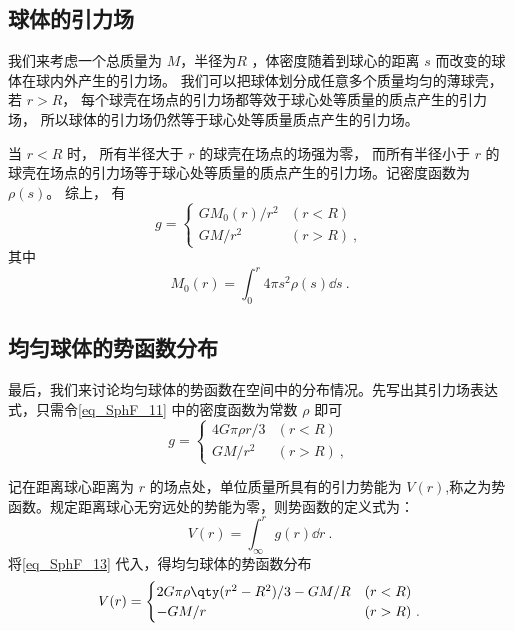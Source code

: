 \subsection{球体的引力场}
我们来考虑一个总质量为 $M$，半径为$R$ ，体密度随着到球心的距离 $s$ 而改变的球体在球内外产生的引力场。 我们可以把球体划分成任意多个质量均匀的薄球壳， 若 $r > R$， 每个球壳在场点的引力场都等效于球心处等质量的质点产生的引力场， 所以球体的引力场仍然等于球心处等质量质点产生的引力场。

当 $r < R$ 时， 所有半径大于 $r$ 的球壳在场点的场强为零， 而所有半径小于 $r$ 的球壳在场点的引力场等于球心处等质量的质点产生的引力场。记密度函数为 $\rho(s)$。 综上， 有
\begin{equation}\label{eq_SphF_11}
g =
\begin{cases}
GM_0(r)/r^2 &(r < R)\\
GM/r^2 & (r > R)~,
\end{cases}
\end{equation}
其中
\begin{equation}
M_0(r) = \int_0^r 4\pi s^2 \rho(s) \dd{s}~.
\end{equation}

\subsection{均匀球体的势函数分布}
最后，我们来讨论均匀球体的势函数在空间中的分布情况。先写出其引力场表达式，只需令\autoref{eq_SphF_11}  中的密度函数为常数 $\rho$ 即可
\begin{equation}\label{eq_SphF_13}
g =
\begin{cases}
4G\pi \rho r/3  &(r < R)\\
GM/r^2 & (r > R)~,
\end{cases}
\end{equation}

记在距离球心距离为 $r$ 的场点处，单位质量所具有的引力势能为 $V(r)$,称之为势函数。规定距离球心无穷远处的势能为零，则势函数的定义式为：
\begin{equation}
V(r) = \int_\infty^r g(r) \dd{r}~.
\end{equation}
将\autoref{eq_SphF_13} 代入，得均匀球体的势函数分布
\begin{equation}
V(r) =
\begin{cases}
2G\pi \rho \qty(r^2-R^2)/3 - GM/R  &(r < R)\\
-GM/r & (r > R)~.
\end{cases}
\end{equation}
